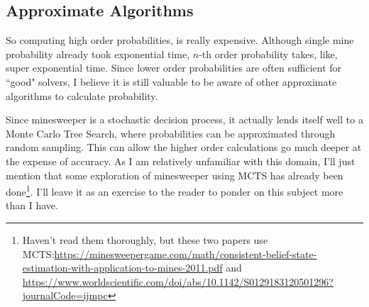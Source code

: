 \subsection{Approximate Algorithms}

So computing high order probabilities, is really expensive. Although single mine probability already took exponential time, $n$-th order probability takes, like, super exponential time. Since lower order probabilities are often sufficient for ``good" solvers, I believe it is still valuable to be aware of other approximate algorithms to calculate probability.

Since minesweeper is a stochastic decision process, it actually lends itself well to a Monte Carlo Tree Search, where probabilities can be approximated through random sampling. This can allow the higher order calculations go much deeper at the expense of accuracy. As I am relatively unfamiliar with this domain, I'll just mention that some exploration of minesweeper using MCTS has already been done\footnote{Haven't read them thoroughly, but these two papers use MCTS:\url{https://minesweepergame.com/math/consistent-belief-state-estimation-with-application-to-mines-2011.pdf} and \url{https://www.worldscientific.com/doi/abs/10.1142/S0129183120501296?journalCode=ijmpc}}. I'll leave it as an exercise to the reader to ponder on this subject more than I have.